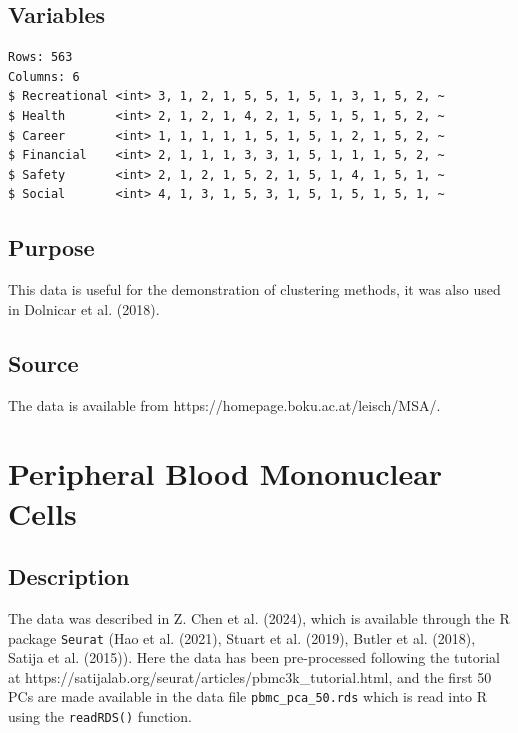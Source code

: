 \documentclass[
  letterpaper,
]{krantz}
\begin{document}
\subsection*{Variables}\label{variables-13}

\begin{verbatim}
Rows: 563
Columns: 6
$ Recreational <int> 3, 1, 2, 1, 5, 5, 1, 5, 1, 3, 1, 5, 2, ~
$ Health       <int> 2, 1, 2, 1, 4, 2, 1, 5, 1, 5, 1, 5, 2, ~
$ Career       <int> 1, 1, 1, 1, 1, 5, 1, 5, 1, 2, 1, 5, 2, ~
$ Financial    <int> 2, 1, 1, 1, 3, 3, 1, 5, 1, 1, 1, 5, 2, ~
$ Safety       <int> 2, 1, 2, 1, 5, 2, 1, 5, 1, 4, 1, 5, 1, ~
$ Social       <int> 4, 1, 3, 1, 5, 3, 1, 5, 1, 5, 1, 5, 1, ~
\end{verbatim}

\subsection*{Purpose}\label{purpose-13}

This data is useful for the demonstration of clustering methods, it was
also used in Dolnicar et al. (2018).

\subsection*{Source}\label{source-13}

The data is available from https://homepage.boku.ac.at/leisch/MSA/.

\section{Peripheral Blood Mononuclear
Cells}\label{peripheral-blood-mononuclear-cells}

\subsection*{Description}\label{description-14}

The data was described in Z. Chen et al. (2024), which is available
through the R package \texttt{Seurat} (Hao et al. (2021), Stuart et al.
(2019), Butler et al. (2018), Satija et al. (2015)). Here the data has
been pre-processed following the tutorial at
https://satijalab.org/seurat/articles/pbmc3k\_tutorial.html, and the
first 50 PCs are made available in the data file
\texttt{pbmc\_pca\_50.rds} which is read into R using the
\texttt{readRDS()} function.
\end{document}
